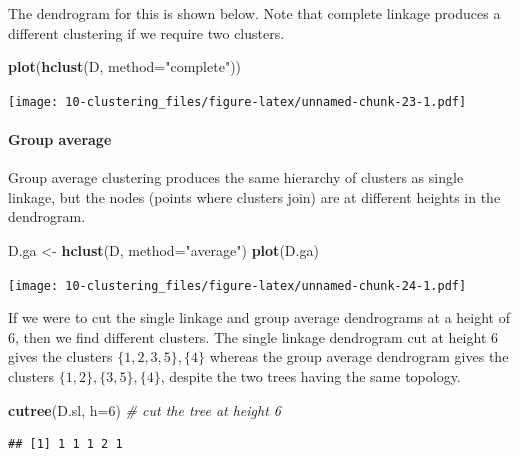 \documentclass[
]{book}
\newenvironment{Shaded}{\begin{snugshade}}{\end{snugshade}}
\newcommand{\AttributeTok}[1]{\textcolor[rgb]{0.13,0.29,0.53}{#1}}
\newcommand{\CommentTok}[1]{\textcolor[rgb]{0.56,0.35,0.01}{\textit{#1}}}
\newcommand{\DecValTok}[1]{\textcolor[rgb]{0.00,0.00,0.81}{#1}}
\newcommand{\FunctionTok}[1]{\textcolor[rgb]{0.13,0.29,0.53}{\textbf{#1}}}
\newcommand{\NormalTok}[1]{#1}
\newcommand{\OtherTok}[1]{\textcolor[rgb]{0.56,0.35,0.01}{#1}}
\newcommand{\StringTok}[1]{\textcolor[rgb]{0.31,0.60,0.02}{#1}}
\theoremstyle{definition}
\theoremstyle{definition}
\theoremstyle{definition}
\theoremstyle{definition}
\theoremstyle{remark}
\begin{document}
The dendrogram for this is shown below. Note that complete linkage produces a different clustering if we require two clusters.

\begin{Shaded}
\begin{Highlighting}[]
\FunctionTok{plot}\NormalTok{(}\FunctionTok{hclust}\NormalTok{(D, }\AttributeTok{method=}\StringTok{"complete"}\NormalTok{))}
\end{Highlighting}
\end{Shaded}

\texttt{[image: 10-clustering\_files/figure-latex/unnamed-chunk-23-1.pdf]}

\hypertarget{group-average}{%
\paragraph*{Group average}\label{group-average}}

Group average clustering produces the same hierarchy of clusters as single linkage, but the nodes (points where clusters join) are at different heights in the dendrogram.

\begin{Shaded}
\begin{Highlighting}[]
\NormalTok{D.ga }\OtherTok{\textless{}{-}} \FunctionTok{hclust}\NormalTok{(D, }\AttributeTok{method=}\StringTok{"average"}\NormalTok{)}
\FunctionTok{plot}\NormalTok{(D.ga)}
\end{Highlighting}
\end{Shaded}

\texttt{[image: 10-clustering\_files/figure-latex/unnamed-chunk-24-1.pdf]}

If we were to cut the single linkage and group average dendrograms at a height of 6, then we find different clusters. The single linkage dendrogram cut at height 6 gives the clusters \(\{1,2,3,5\}, \{4\}\) whereas the group average dendrogram gives the clusters \(\{1,2\}, \{3,5\}, \{4\}\), despite the two trees having the same topology.

\begin{Shaded}
\begin{Highlighting}[]
\FunctionTok{cutree}\NormalTok{(D.sl, }\AttributeTok{h=}\DecValTok{6}\NormalTok{) }\CommentTok{\# cut the tree at height 6}
\end{Highlighting}
\end{Shaded}

\begin{verbatim}
## [1] 1 1 1 2 1
\end{verbatim}
\end{document}
